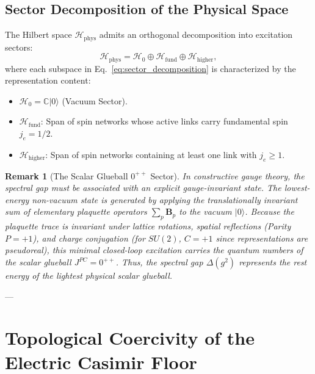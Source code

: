 \documentclass[11pt,reqno]{article}
\newtheorem{remark}[theorem]{Remark}
\begin{document}
\subsection{Sector Decomposition of the Physical Space}
The Hilbert space $\mathcal{H}_{\mathrm{phys}}$ admits an orthogonal decomposition into excitation sectors:
\begin{equation}
    \label{eq:sector_decomposition}
    \mathcal{H}_{\mathrm{phys}} = \mathcal{H}_0 \oplus \mathcal{H}_{\mathrm{fund}} \oplus \mathcal{H}_{\mathrm{higher}},
\end{equation}
where each subspace in Eq.~\eqref{eq:sector_decomposition} is characterized by the representation content:
\begin{itemize}
    \item $\mathcal{H}_0 = \mathbb{C} |0\rangle$ (Vacuum Sector).
    \item $\mathcal{H}_{\mathrm{fund}}$: Span of spin networks whose active links carry fundamental spin $j_e = 1/2$.
    \item $\mathcal{H}_{\mathrm{higher}}$: Span of spin networks containing at least one link with $j_e \ge 1$.
\end{itemize}

\begin{remark}[The Scalar Glueball $0^{++}$ Sector]
\label{rem:scalar_glueball}
In constructive gauge theory, the spectral gap must be associated with an explicit gauge-invariant state. The lowest-energy non-vacuum state is generated by applying the translationally invariant sum of elementary plaquette operators $\sum_p \mathbf{B}_p$ to the vacuum $|0\rangle$. Because the plaquette trace is invariant under lattice rotations, spatial reflections (Parity $P = +1$), and charge conjugation (for $SU(2)$, $C = +1$ since representations are pseudoreal), this minimal closed-loop excitation carries the quantum numbers of the scalar glueball $J^{PC} = 0^{++}$. Thus, the spectral gap $\Delta(g^2)$ represents the rest energy of the lightest physical scalar glueball.
\end{remark}

---

\section{Topological Coercivity of the Electric Casimir Floor}
\label{sec:casimir_floor}
\end{document}
